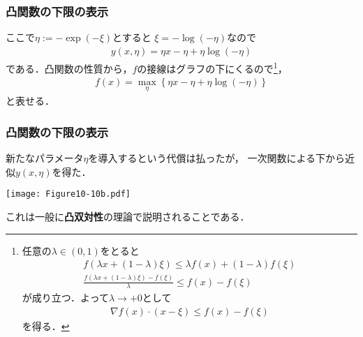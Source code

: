 \documentclass[10pt,usepdftitle=false,hyperref={unicode}]{beamer}
\newcommand{\parentheses}[1]{\left(#1\right)}
\newcommand{\braces}[1]{\left\{#1\right\}}
\begin{document}
\begin{frame}
\frametitle{凸関数の下限の表示}
ここで$\eta := -\exp\parentheses{-\xi}$とすると
$\xi = -\log \parentheses{-\eta}$なので
\begin{align}
    y\parentheses{x,\eta} = \eta x - \eta + \eta\log\parentheses{-\eta} \tag{10.127}
\end{align}
である．凸関数の性質から，$f$の接線はグラフの下にくるので\footnote[frame]{%
任意の$\lambda \in \parentheses{0,1}$をとると
\begin{gather*}
f\parentheses{\lambda x + \parentheses{1 - \lambda}\xi} \leq \lambda f\parentheses{x} + \parentheses{1 - \lambda}f\parentheses{\xi}\\
\frac{f\parentheses{\lambda x + \parentheses{1 - \lambda}\xi} - f\parentheses{\xi}}{\lambda} \leq f\parentheses{x} - f\parentheses{\xi}
\end{gather*}
が成り立つ．よって$\lambda \to +0$として
\begin{align*}
    \nabla f\parentheses{x} \cdot \parentheses{x - \xi} \leq f\parentheses{x} - f\parentheses{\xi}
\end{align*}
を得る．
}，
\begin{align}
    f\parentheses{x} = \max_\eta \braces{\eta x  - \eta + \eta \log\parentheses{- \eta}} \tag{10.128}
\end{align}
と表せる．
\end{frame}

\begin{frame}
\frametitle{凸関数の下限の表示}
新たなパラメータ$\eta$を導入するという代償は払ったが，
一次関数による下から近似$y\parentheses{x,\eta}$を得た．

\smallskip

\begin{center}
    \texttt{[image: Figure10-10b.pdf]}
\end{center}

\smallskip

これは一般に\textbf{凸双対性}の理論で説明されることである．
\end{frame}
\end{document}
